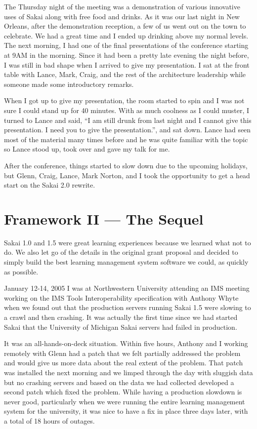 \documentclass[12pt]{book}
\begin{document}
The Thursday night of the meeting was a
demonstration of various innovative uses of Sakai
along with free food and drinks.  As it
was our last night in New Orleans, after the
demonstration reception, a few of us went
out on the town to celebrate.  We had a great time
and I ended up drinking above my normal levels.
The next morning, I had one of the
final presentations of the conference starting
at 9AM in the morning.  Since it had been a
pretty late evening the night before, I was
still in bad shape when I arrived to give
my presentation.  I sat at the front table
with Lance, Mark, Craig, and the rest of the
architecture leadership while someone made
some introductory remarks.

When I got up to give my presentation, the room
started to spin and I was not sure I could
stand up for 40 minutes.  With as much coolness
as I could muster, I turned to Lance and
said, ``I am still drunk from last night
and I cannot give this presentation.  I need
you to give the presentation.'', and sat down.
Lance had seen most of the material many times
before and he was quite familiar with the topic
so Lance stood up, took over and gave my
talk for me.

After the conference, things started to slow
down due to the upcoming holidays, but Glenn,
Craig, Lance, Mark Norton, and I took the
opportunity to get a head start on the Sakai
2.0 rewrite.

\chapter{Framework II --- The Sequel}

Sakai 1.0 and 1.5 were great learning experiences because
we learned what not to do.  We also let go of the details
in the original grant proposal and decided to simply build
the best learning management system software we could,
as quickly as possible.

January 12-14, 2005 I was at Northwestern University attending
an IMS meeting working on the IMS Tools Interoperability
specification with Anthony Whyte when we found out
that the production servers
running Sakai 1.5 were slowing to a crawl and then crashing.
It was actually the first time since we had started Sakai
that the University of Michigan Sakai servers had failed
in production.

It was an all-hands-on-deck situation.  Within five hours,
Anthony and I working remotely with Glenn had a patch that we felt
partially addressed the problem and would give us more data
about the real extent of the problem.  That patch was
installed the next morning and we limped through the day
with sluggish data but no crashing servers and based on
the data we had collected developed a second patch which
fixed the problem.  While having a production
slowdown is never good, particularly when we were running
the entire learning management system for the university,
it was nice to have a fix in place three days later, with
a total of 18 hours of outages.
\end{document}
